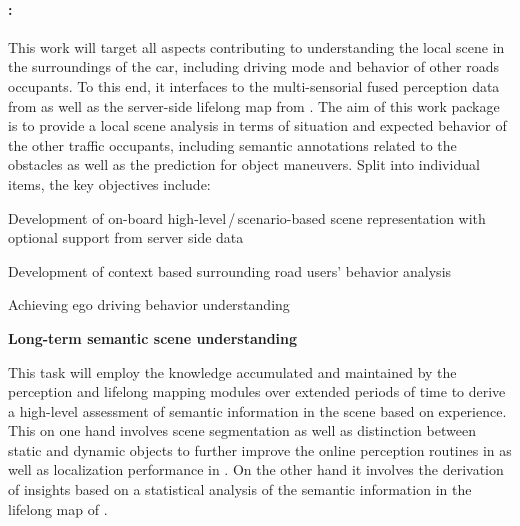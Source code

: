
\paragraph{\WPSceneUnderstanding: \WPSceneUnderstandingTitle\\}
{\noindent\wptablefont
\label{wp7}

\wptableheaderB{\WPSceneUnderstandingVW}{\WPSceneUnderstandingETHZ}{\WPSceneUnderstandingIBM}{\WPSceneUnderstandingCLUJ}{\WPSceneUnderstandingPRAGUE}


This work will target all aspects contributing to understanding the local scene in the surroundings of the car, including driving mode and behavior of other roads occupants. To this end, it interfaces to the multi-sensorial fused perception data from \WPPerception as well as the server-side lifelong map from \WPMapping. The aim of this work package is to provide a local scene analysis in terms of situation and expected behavior of the other traffic occupants, including semantic annotations related to the obstacles as well as the prediction for object maneuvers. Split into individual items, the key objectives include:
\begin{denseItemize}
\item Development of on-board high-level\,/\,scenario-based scene representation with optional support from server side data
\item Development of context based surrounding road users' behavior analysis
\item Achieving ego driving behavior understanding
\end{denseItemize}



\begin{tasks}{\WPSceneUnderstandingNo}

\item  {\bf Long-term semantic scene understanding}
  \taskpartners{\IBM}{\ETHZ, \VW}
\label{task:sceneunderstanding:semanticunderstanding}

This task will employ the knowledge accumulated and maintained by the perception and lifelong mapping modules over extended periods of time to derive a high-level assessment of semantic information in the scene based on experience. This on one hand involves scene segmentation as well as distinction between static and dynamic objects to further improve the online perception routines in \WPPerception as well as localization performance in \WPMapping. On the other hand it involves the derivation of insights based on a statistical analysis of the semantic information in the lifelong map of \WPMapping.



\end{tasks}}
